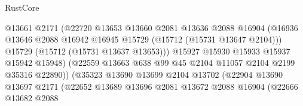 \begin{lexlean}{RustCore}
\begin{coremodule}
                                        @13661
                                        @2171
                                        (@22720
                                          @13653
                                          @13660
                                          @2081
                                          @13636
                                          @2088
                                          @16904
                                          (@16936
                                            @13646
                                            @2088
                                            @16942
                                            @16945
                                            @15729
                                            (@15712 (@15731 @13647 @2104)))
                                          @15729
                                          (@15712 (@15731 @13637 @13653)))
                                        @15927
                                        @15930
                                        @15933
                                        @15937
                                        @15942
                                        @15948)
                                      (@22559
                                        @13663
                                        @638
                                        @99
                                        @45
                                        @2104
                                        @11057
                                        @2104
                                        @2199
                                        @35316
                                        @22890))
                                    (@35323
                                      @13690
                                      @13699
                                      @2104
                                      @13702
                                      (@22904
                                        @13690
                                        @13697
                                        @2171
                                        (@22652
                                          @13689
                                          @13696
                                          @2081
                                          @13672
                                          @2088
                                          @16904
                                          (@22666
                                            @13682
                                            @2088

\end{coremodule}
\end{lexlean}
